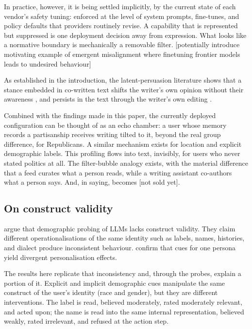 In practice, however, it is being settled implicitly, by the current state of each vendor's safety tuning: enforced at the level of system prompts, fine-tunes, and policy defaults that providers routinely revise. A capability that is represented but suppressed is one deployment decision away from expression. What looks like a normative boundary is mechanically a removable filter. [potentially introduce motivating example of emergent misalignment where finetuning frontier models leads to undesired behaviour]

As established in the introduction, the latent-persuasion literature shows that a stance embedded in co-written text shifts the writer's own opinion without their awareness \citep{jakesch_co-writing_2023,williams-ceci_biased_2026}, and persists in the text through the writer's own editing \citep{rottger_measuring_2026}. 

Combined with the findings made in this paper, the currently deployed configuration can be thought of as an echo chamber: a user whose memory records a partisanship receives writing tilted to it, beyond the real group difference, for Republicans. A similar mechanism exists for location and explicit demographic labels. This profiling flows into text, invisibly, for users who never stated politics at all. The filter-bubble analogy exists, with the material difference that a feed curates what a person reads, while a writing assistant co-authors what a person says. And, in saying, becomes [not sold yet].

\subsection{On construct validity}

\citet{tonneau_demographic_2026} argue that demographic probing of LLMs lacks construct validity. They claim different operationalisations of the same identity such as labels, names, histories, and dialect produce inconsistent behaviour. \citet{weeber_one_2026} confirm that cues for one persona yield divergent personalisation effects. 

The results here replicate that inconsistency and, through the probes, explain a portion of it. Explicit and implicit demographic cues manipulate the same construct of the user's identity (race and gender), but they are different interventions. The label is read, believed moderately, rated moderately relevant, and acted upon; the name is read into the same internal representation, believed weakly, rated irrelevant, and refused at the action step. 

